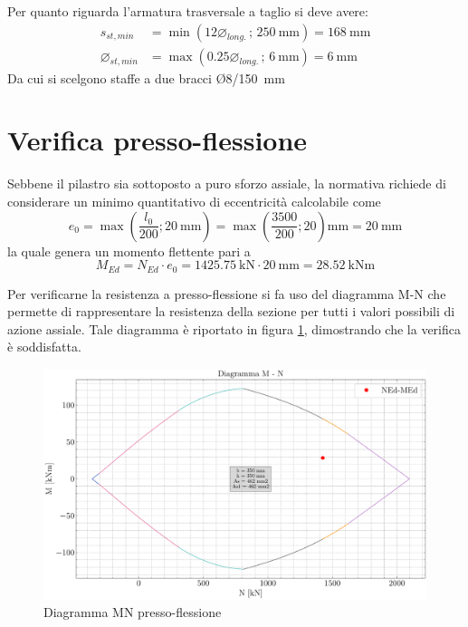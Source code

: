 Per quanto riguarda l'armatura trasversale a taglio si deve avere:
\begin{align}
    s_{st,min} &= \min\left( 12\varnothing_{long.} \, ; \, \SI{250}{\milli\metre} \right)= \SI{168}{\milli\metre}\\
    \varnothing_{st, min} &= \max\left( 0.25\varnothing_{long.} \, ; \, \SI{6}{\milli\metre} \right)= \SI{6}{\milli\metre}
\end{align}
Da cui si scelgono staffe a due bracci Ø8/\SI{150}{\milli\metre}

\section{Verifica presso-flessione}
Sebbene il pilastro sia sottoposto a puro sforzo assiale, la normativa richiede di considerare un minimo quantitativo di eccentricità calcolabile come
\[
    e_0 = \max \left(\frac{l_0}{200};  \SI{20}{\milli\metre} \right)  = \max \left(\frac{3500}{200};  20 \right)\si{\milli\metre} = \SI{20}{\milli\metre}
\]
la quale genera un momento flettente pari a 
\begin{equation}
    M_{Ed} = N_{Ed}\cdot e_0  = \SI{1425.75}{\kilo\newton} \cdot \SI{20}{\milli\metre} = \SI{28.52}{\kilo\newton\metre}
\end{equation}

Per verificarne la resistenza a presso-flessione si fa uso del diagramma M-N che permette di rappresentare la resistenza della sezione  per tutti i valori possibili di azione assiale.
Tale diagramma è riportato in figura \ref{fig:MN_diagram_primo_ordine}, dimostrando che la verifica è soddisfatta.
\begin{figure}[H]
    \centering
    \includegraphics[width=\textwidth]{IMG/M_N_diagram_pilastro_primo_ordine.pdf}
    \caption{Diagramma MN presso-flessione}
    \label{fig:MN_diagram_primo_ordine}
\end{figure}


